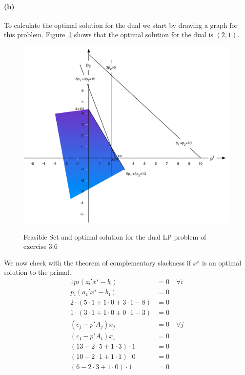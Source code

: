\documentclass[a4paper, 12pt]{report}
\begin{document}
\paragraph{(b)} To calculate the optimal solution for the dual we start by
drawing a graph for this problem.
Figure~\ref{figure:Exercise_3_6_Feasible_Region_Dual} shows that the optimal
solution for the dual is $(2,1)$.\\

\begin{figure}[htbp]
    \caption{Feasible Set and optimal solution for the dual LP problem of
             exercise 3.6}
    \vskip 0.2cm
    \centering
    \includegraphics[width=\textwidth]
        {Figures/Exercise_3_6_Feasible_Region_Dual}
    \label{figure:Exercise_3_6_Feasible_Region_Dual}
\end{figure}

We now check with the theorem of complementary slackness if $x^∗$ is an optimal
solution to the primal.
\begin{alignat*}{1}
    pi(aᵢ′x^∗−bᵢ)           &= 0 \quad ∀i\\
    p₁(a₁′x^∗-b₁)           &= 0\\[5pt]
    2·(5·1 + 1·0 + 3·1 - 8) &= 0\\
    1·(3·1 + 1·0 + 0·1 - 3) &= 0\\[10pt]
    (c_j − p′A_j)x_j        &= 0 \quad∀j\\
    (c₁ − p′A₁)x₁           &= 0\\[5pt]
    (13 − 2·5 + 1·3) · 1    &= 0\\
    (10 − 2·1 + 1·1) · 0    &= 0\\
    ( 6 − 2·3 + 1·0) · 1    &= 0\\
\end{alignat*}
\end{document}
